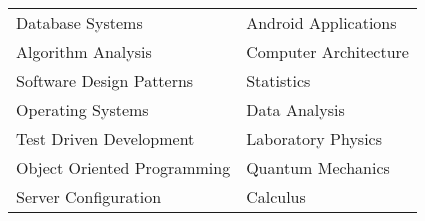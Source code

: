 \documentclass[10pt]{article}
\newcommand{\simsbullet}{{\raisebox{2pt}{\tiny $\bullet$}}\hspace{8pt}}
\begin{document}
\vskip 8pt

{}

\vskip 4pt

\setlength{\leftskip}{16pt}


  \begin{tabular}{ l@{\hskip 2.2in} l }

    \simsbullet Database Systems & \simsbullet Android Applications \\
    \simsbullet Algorithm Analysis & \simsbullet Computer Architecture \\
    \simsbullet Software Design Patterns & \simsbullet Statistics \\
    \simsbullet Operating Systems & \simsbullet Data Analysis\\
    \simsbullet Test Driven Development & \simsbullet Laboratory Physics \\
    \simsbullet Object Oriented Programming & \simsbullet Quantum Mechanics \\
    \simsbullet Server Configuration & \simsbullet Calculus  \\

  \end{tabular}


\setlength{\leftskip}{0pt}



\end{document}
